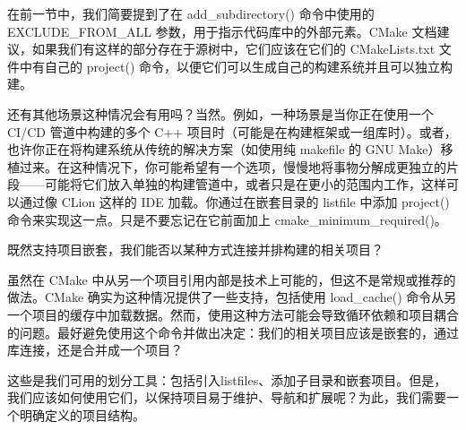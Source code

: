 
在前一节中，我们简要提到了在 add\_subdirectory() 命令中使用的 EXCLUDE\_FROM\_ALL 参数，用于指示代码库中的外部元素。CMake 文档建议，如果我们有这样的部分存在于源树中，它们应该在它们的 CMakeLists.txt 文件中有自己的 project() 命令，以便它们可以生成自己的构建系统并且可以独立构建。

还有其他场景这种情况会有用吗？当然。例如，一种场景是当你正在使用一个 CI/CD 管道中构建的多个 C++ 项目时（可能是在构建框架或一组库时）。或者，也许你正在将构建系统从传统的解决方案（如使用纯 makefile 的 GNU Make）移植过来。在这种情况下，你可能希望有一个选项，慢慢地将事物分解成更独立的片段——可能将它们放入单独的构建管道中，或者只是在更小的范围内工作，这样可以通过像 CLion 这样的 IDE 加载。你通过在嵌套目录的 listfile 中添加 project() 命令来实现这一点。只是不要忘记在它前面加上 cmake\_minimum\_required()。

既然支持项目嵌套，我们能否以某种方式连接并排构建的相关项目？


虽然在 CMake 中从另一个项目引用内部是技术上可能的，但这不是常规或推荐的做法。CMake 确实为这种情况提供了一些支持，包括使用 load\_cache() 命令从另一个项目的缓存中加载数据。然而，使用这种方法可能会导致循环依赖和项目耦合的问题。最好避免使用这个命令并做出决定：我们的相关项目应该是嵌套的，通过库连接，还是合并成一个项目？

这些是我们可用的划分工具：包括引入listfiles、添加子目录和嵌套项目。但是，我们应该如何使用它们，以保持项目易于维护、导航和扩展呢？为此，我们需要一个明确定义的项目结构。





















